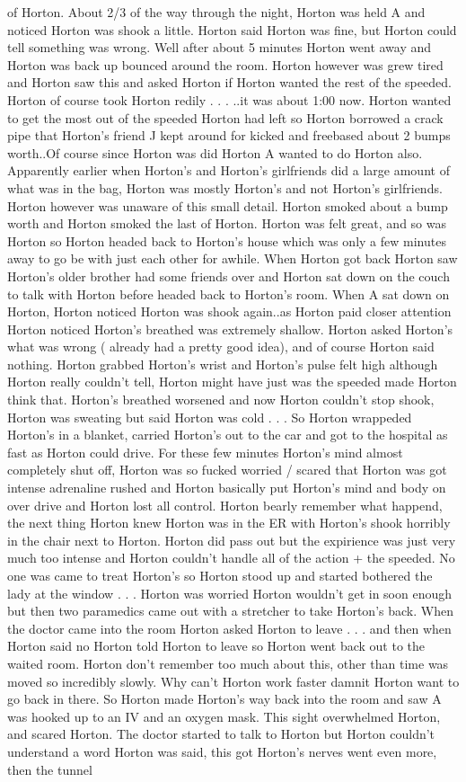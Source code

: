 \documentclass[12pt]{book}
\begin{document}
of Horton. About 2/3 of the way through the night, Horton was held A and noticed Horton was shook a little. Horton said Horton was fine, but Horton could tell something was wrong. Well after about 5 minutes Horton went away and Horton was back up bounced around the room. Horton however was grew tired and Horton saw this and asked Horton if Horton wanted the rest of the speeded. Horton of course took Horton redily . . .  ..it was about 1:00 now. Horton wanted to get the most out of the speeded Horton had left so Horton borrowed a crack pipe that Horton's friend J kept around for kicked and freebased about 2 bumps worth..Of course since Horton was did Horton A wanted to do Horton also. Apparently earlier when Horton's and Horton's girlfriends did a large amount of what was in the bag, Horton was mostly Horton's and not Horton's girlfriends. Horton however was unaware of this small detail. Horton smoked about a bump worth and Horton smoked the last of Horton. Horton was felt great, and so was Horton so Horton headed back to Horton's house which was only a few minutes away to go be with just each other for awhile. When Horton got back Horton saw Horton's older brother had some friends over and Horton sat down on the couch to talk with Horton before headed back to Horton's room. When A sat down on Horton, Horton noticed Horton was shook again..as Horton paid closer attention Horton noticed Horton's breathed was extremely shallow. Horton asked Horton's what was wrong ( already had a pretty good idea), and of course Horton said nothing. Horton grabbed Horton's wrist and Horton's pulse felt high although Horton really couldn't tell, Horton might have just was the speeded made Horton think that. Horton's breathed worsened and now Horton couldn't stop shook, Horton was sweating but said Horton was cold . . .  So Horton wrappeded Horton's in a blanket, carried Horton's out to the car and got to the hospital as fast as Horton could drive. For these few minutes Horton's mind almost completely shut off, Horton was so fucked worried / scared that Horton was got intense adrenaline rushed and Horton basically put Horton's mind and body on over drive and Horton lost all control. Horton bearly remember what happend, the next thing Horton knew Horton was in the ER with Horton's shook horribly in the chair next to Horton. Horton did pass out but the expirience was just very much too intense and Horton couldn't handle all of the action + the speeded. No one was came to treat Horton's so Horton stood up and started bothered the lady at the window . . .  Horton was worried Horton wouldn't get in soon enough but then two paramedics came out with a stretcher to take Horton's back. When the doctor came into the room Horton asked Horton to leave . . .  and then when Horton said no Horton told Horton to leave so Horton went back out to the waited room. Horton don't remember too much about this, other than time was moved so incredibly slowly. Why can't Horton work faster damnit Horton want to go back in there. So Horton made Horton's way back into the room and saw A was hooked up to an IV and an oxygen mask. This sight overwhelmed Horton, and scared Horton. The doctor started to talk to Horton but Horton couldn't understand a word Horton was said, this got Horton's nerves went even more, then the tunnel 
\end{document}
